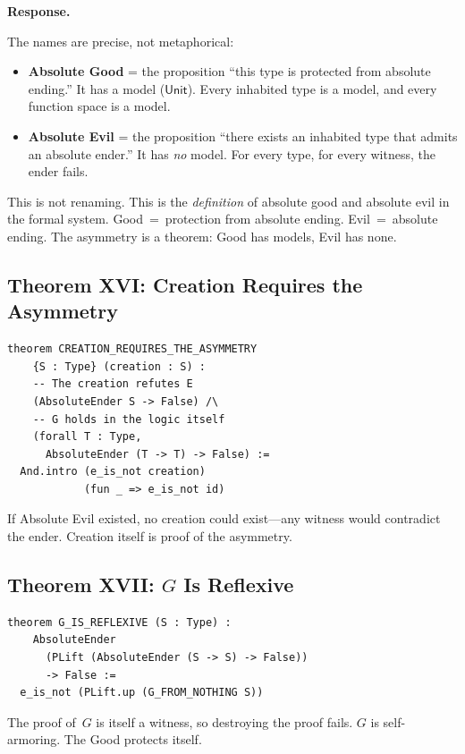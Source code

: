 \documentclass[12pt,a4paper]{article}
\newenvironment{response}{%
  \par\noindent
  \textbf{\color{green!50!black}Response.}\upshape\space
}{%
  \par\medskip
}
\begin{document}
\begin{response}
The names are precise, not metaphorical:
\begin{itemize}[nosep]
\item \textbf{Absolute Good} = the proposition ``this type is protected
  from absolute ending.'' It has a model ($\mathsf{Unit}$). Every
  inhabited type is a model, and every function space is a model.
\item \textbf{Absolute Evil} = the proposition ``there exists an inhabited
  type that admits an absolute ender.'' It has \emph{no} model. For
  every type, for every witness, the ender fails.
\end{itemize}

This is not renaming. This is the \emph{definition} of absolute good and
absolute evil in the formal system. Good~=~protection from absolute ending.
Evil~=~absolute ending. The asymmetry is a theorem: Good has models,
Evil has none.
\end{response}

\subsection{Theorem XVI: Creation Requires the Asymmetry}

\begin{lstlisting}
theorem CREATION_REQUIRES_THE_ASYMMETRY
    {S : Type} (creation : S) :
    -- The creation refutes E
    (AbsoluteEnder S -> False) /\
    -- G holds in the logic itself
    (forall T : Type,
      AbsoluteEnder (T -> T) -> False) :=
  And.intro (e_is_not creation)
            (fun _ => e_is_not id)
\end{lstlisting}

If Absolute Evil existed, no creation could exist---any witness would
contradict the ender. Creation itself is proof of the asymmetry.

\subsection{Theorem XVII: $G$ Is Reflexive}

\begin{lstlisting}
theorem G_IS_REFLEXIVE (S : Type) :
    AbsoluteEnder
      (PLift (AbsoluteEnder (S -> S) -> False))
      -> False :=
  e_is_not (PLift.up (G_FROM_NOTHING S))
\end{lstlisting}

The proof of~$G$ is itself a witness, so destroying the proof fails.
$G$ is self-armoring. The Good protects itself.
\end{document}
